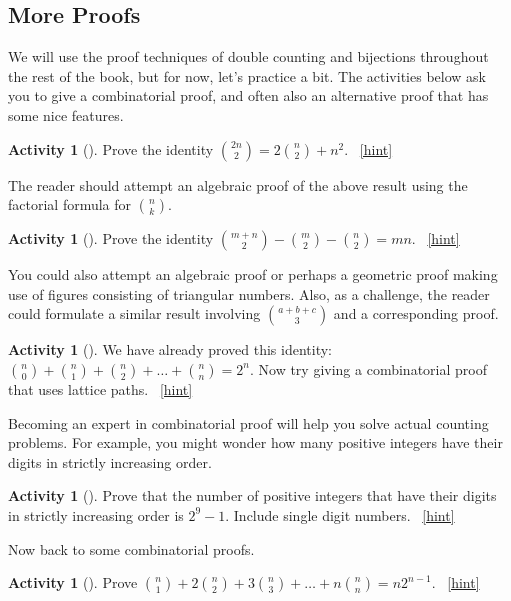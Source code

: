 \documentclass[10pt,]{book}
\theoremstyle{plain}
\theoremstyle{definition}
\theoremstyle{definition}
\theoremstyle{definition}
\newtheorem{activity}[project]{Activity}
\numberwithin{equation}{chapter}
\begin{document}
\subsection[{More Proofs}]{More Proofs}\label{subsec-moreproofs}
\hypertarget{p-678}{}%
We will use the proof techniques of double counting and bijections throughout the rest of the book, but for now, let's practice a bit.  The activities below ask you to give a combinatorial proof, and often also an alternative proof that has some nice features.%
\begin{activity}[]\label{act-redgreenballs}
\hypertarget{p-679}{}%
Prove the identity \(\binom{2n}{2} = 2 \binom{n}{2} + n^{2}\).%
~\hfill{\tiny\hyperlink{a-94}{[hint]}\hypertarget{q-94}{}}\end{activity}
\hypertarget{p-683}{}%
The reader should attempt an algebraic proof of the above result using the factorial formula for \(\binom{n}{k}\).%
\begin{activity}[]\label{act-bowtiefez}
\hypertarget{p-684}{}%
Prove the identity \(\binom{m + n}{2} - \binom{m}{2} - \binom{n}{2} = mn\).%
~\hfill{\tiny\hyperlink{a-95}{[hint]}\hypertarget{q-95}{}}\end{activity}
\hypertarget{p-687}{}%
You could also attempt an algebraic proof or perhaps a geometric proof making use of figures consisting of triangular numbers. Also, as a challenge, the reader could formulate a similar result involving \(\binom{a + b + c}{3}\) and a corresponding proof.%
\begin{activity}[]\label{activity-89}
\hypertarget{p-688}{}%
We have already proved this identity: \(\binom{n}{0} + \binom{n}{1} + \binom{n}{2} + \ldots + \binom{n}{n} = 2^{n}\).  Now try giving a combinatorial proof that uses lattice paths.%
~\hfill{\tiny\hyperlink{a-96}{[hint]}\hypertarget{q-96}{}}\end{activity}
\hypertarget{p-691}{}%
Becoming an expert in combinatorial proof will help you solve actual counting problems.  For example, you might wonder how many positive integers have their digits in strictly increasing order.%
\begin{activity}[]\label{activity-90}
\hypertarget{p-692}{}%
Prove that the number of positive integers that have their digits in strictly increasing order is \(2^{9} - 1\). Include single digit numbers.%
~\hfill{\tiny\hyperlink{a-97}{[hint]}\hypertarget{q-97}{}}\end{activity}
\hypertarget{p-696}{}%
Now back to some combinatorial proofs.%
\begin{activity}[]\label{act_anysizecommittee}
\hypertarget{p-697}{}%
Prove \(\binom{n}{1} + 2 \binom{n}{2} + 3 \binom{n}{3} + \ldots + n \binom{n}{n} = n2^{n - 1}\).%
~\hfill{\tiny\hyperlink{a-98}{[hint]}\hypertarget{q-98}{}}\end{activity}
\end{document}
